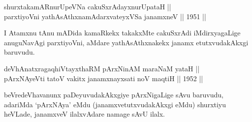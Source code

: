 
\begin{shl}
shurxtakamARnurUpeVNa cakuSxrAdayxnurUpataH || \\
parxtiyoVni yathAsAthxnamAdarxvateyxVSa janamxneV \hfill || 1951 ||
  
\end{shl}

\begin{artha}
I Atamxnu tAnu mADida kamaRkekx takakxMte cakuSxrAdi iMdirxyagaLige
anuguNavAgi parxtiyoVni, aMdare yathAsAthxnakekx janamx
etutxvudakAkxgi baruvudu.
\end{artha}

\begin{shl}
deVhAnatxragaqhiVtayxthaRM pArxNinAM maraNaM yataH || \\
pArxNAyeVti tatoV vakitx janamxnayxsati noV maqtiH \hfill || 1952 ||
  
\end{shl}

\begin{artha}
beVredeVhavanunx paDeyuvudakAkxgiye pArxNigaLige sAvu baruvudu,
adariMda `pArxNAya' eMdu (janamxvetutxvudakAkxgi eMdu) shurxtiyu
heVLade, janamxveV ilalxvAdare namage sAvU ilalx.
\end{artha}


